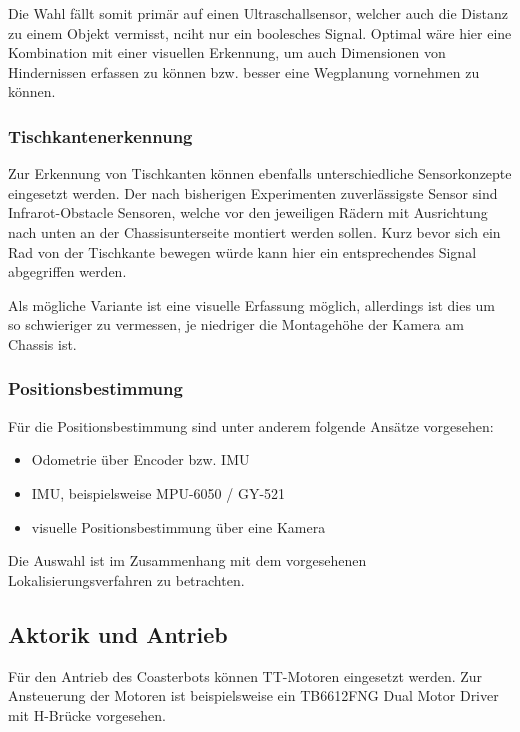 \documentclass[
  a4paper,
  12pt,
  DIV=12,        %
  parskip=half,  %
  headings=small %
]{scrartcl}
\theoremstyle{definition}
\providecommand{\tightlist}{%
  \setlength{\itemsep}{0pt}\setlength{\parskip}{0pt}}
\theoremstyle{definition}
\begin{document}
Die Wahl fällt somit primär auf einen Ultraschallsensor, welcher auch die Distanz zu einem Objekt vermisst, nciht nur ein boolesches Signal. Optimal wäre hier eine Kombination mit einer visuellen Erkennung, um auch Dimensionen von Hindernissen erfassen zu können bzw. besser eine Wegplanung vornehmen zu können. 

\subsubsection{Tischkantenerkennung}\label{tischkantenerkennung}

Zur Erkennung von Tischkanten können ebenfalls unterschiedliche Sensorkonzepte eingesetzt werden. Der nach bisherigen Experimenten zuverlässigste Sensor sind Infrarot-Obstacle Sensoren, welche vor den jeweiligen Rädern mit Ausrichtung nach unten an der Chassisunterseite montiert werden sollen. Kurz bevor sich ein Rad von der Tischkante bewegen würde kann hier ein entsprechendes Signal abgegriffen werden. 

Als mögliche Variante ist eine visuelle Erfassung möglich, allerdings ist dies um so schwieriger zu vermessen, je niedriger die Montagehöhe der Kamera am Chassis ist. 

\subsubsection{Positionsbestimmung}\label{positionsbestimmung}

Für die Positionsbestimmung sind unter anderem folgende Ansätze
vorgesehen:

\begin{itemize}
\tightlist
\item
  Odometrie über Encoder bzw. IMU
\item
  IMU, beispielsweise MPU-6050 / GY-521
\item
  visuelle Positionsbestimmung über eine Kamera
\end{itemize}

Die Auswahl ist im Zusammenhang mit dem vorgesehenen
Lokalisierungsverfahren zu betrachten.

\subsection{Aktorik und Antrieb}\label{aktorik-und-antrieb}

Für den Antrieb des Coasterbots können TT-Motoren eingesetzt werden. Zur
Ansteuerung der Motoren ist beispielsweise ein TB6612FNG Dual Motor
Driver mit H-Brücke vorgesehen.
\end{document}

